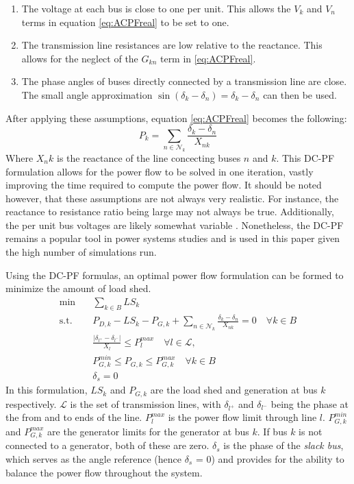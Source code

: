 \documentclass[12pt]{article}
\begin{document}
\begin{enumerate}
  \item The voltage at each bus is close to one per unit. This allows the $V_k$ and $V_n$ terms in equation \eqref{eq:ACPFreal} to be set to one.
  \item The transmission line resistances are low relative to the reactance. This allows for the neglect of the $G_{kn}$ term in \eqref{eq:ACPFreal}.
  \item The phase angles of buses directly connected by a transmission line are close. The small angle approximation $\sin(\delta_k - \delta_n) = \delta_k - \delta_n$ can then be used. 
\end{enumerate}
After applying these assumptions, equation \eqref{eq:ACPFreal}  becomes the following:
\begin{equation} 
    P_k = \sum_{ n \in \mathcal{N}_k }\frac{\delta_k - \delta_n}{X_{nk}}
    \label{eq:DCPF}
\end{equation}
Where $X_nk$ is the reactance of the line concecting buses $n$ and $k$. This DC-PF formulation allows for the power flow to be solved in one iteration, vastly improving the time required to compute the power flow. It should be noted however, that these assumptions are not always very realistic. For instance, the reactance to resistance ratio being large may not always be true. Additionally, the per unit bus voltages are likely somewhat variable \cite{purchala2005}. Nonetheless, the DC-PF remains a popular tool in power systems studies \cite{purchala2005} and is used in this paper given the high number of simulations run. \par
Using the DC-PF formulas, an optimal power flow formulation can be formed to minimize the amount of load shed. 
\begin{align}
    \min \quad & \sum_{k\in B}LS_k \\  
    \text{s.t.} \quad & P_{D, k} - LS_k - P_{G, k} +\sum_{ n \in \mathcal{N}_k }\frac{\delta_k - \delta_n}{X_{nk}} = 0 \quad\forall k\in B \label{powerbalance} \\  
                      & \frac{|\delta_{l^+} - \delta_{l^-}|}{X_{l}} \leq P_{l}^{max} \quad\forall l\in \mathcal{L}, \\  
                      & P_{G, k}^{min}\leq P_{G,k} \leq P_{G, k}^{max} \quad \forall k\in B \\
                      & \delta_s = 0
\end{align}	
In this formulation, $LS_k$ and $P_{G, k}$  are the load shed and generation at bus $k$ respectively. $\mathcal{L}$ is the set of transmission lines, with $\delta_{l^+}$ and $\delta_{l^-}$ being the phase at the from and to ends of the line. $P_{l}^{max}$ is the power flow limit through line $l$.   $P _{G, k}^{min}$ and $P _{G, k}^{max}$ are the generator limits for the generator at bus $k$. If bus $k$ is not connected to a generator, both of these are zero. $\delta_s$ is the phase of the \textit{slack bus}, which serves as the angle reference (hence $\delta_s$ = 0) and provides for the ability to balance the power flow throughout the system. \par
\end{document}

